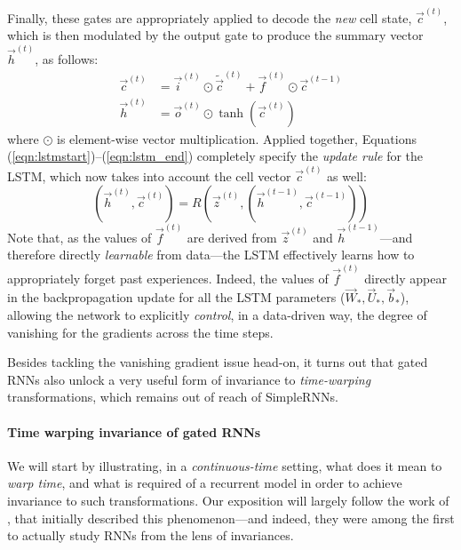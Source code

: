 Finally, these gates are appropriately applied to decode the \emph{new} cell state, $\vec{c}^{(t)}$, which is then modulated by the output gate to produce the summary vector $\vec{h}^{(t)}$, as follows:
\begin{align}
    \vec{c}^{(t)} &= \vec{i}^{(t)}\odot\widetilde{\vec{c}}^{(t)} + \vec{f}^{(t)}\odot\vec{c}^{(t-1)}\\
    \vec{h}^{(t)} &= \vec{o}^{(t)}\odot\tanh(\vec{c}^{(t)})\label{eqn:lstm_end}
\end{align}
where $\odot$ is element-wise vector multiplication. Applied together, Equations (\ref{eqn:lstmstart})--(\ref{eqn:lstm_end}) completely specify the \emph{update rule} for the LSTM, which now takes into account the cell vector $\vec{c}^{(t)}$ as well:
$$
    (\vec{h}^{(t)}, \vec{c}^{(t)}) = R(\vec{z}^{(t)}, (\vec{h}^{(t-1)}, \vec{c}^{(t-1)}))
$$
Note that, as the values of $\vec{f}^{(t)}$ are derived from $\vec{z}^{(t)}$ and $\vec{h}^{(t-1)}$---and therefore directly \emph{learnable} from data---the LSTM effectively learns how to appropriately forget past experiences. Indeed, the values of $\vec{f}^{(t)}$ directly appear in the backpropagation update for all the LSTM parameters ($\vec{W}_*, \vec{U}_*, \vec{b}_*$), allowing the network to explicitly \emph{control}, in a data-driven way, the degree of vanishing for the gradients across the time steps.

Besides tackling the vanishing gradient issue head-on, it turns out that gated RNNs also unlock a very useful form of invariance to \emph{time-warping} transformations, which remains out of reach of SimpleRNNs.

\paragraph{Time warping invariance of gated RNNs} We will start by illustrating, in a \emph{continuous-time} setting, what does it mean to \emph{warp time}, and what is required of a recurrent model in order to achieve invariance to such transformations. Our exposition will largely follow the work of \citet{tallec2018can}, that initially described this phenomenon---and indeed, they were among the first to actually study RNNs from the lens of invariances.

